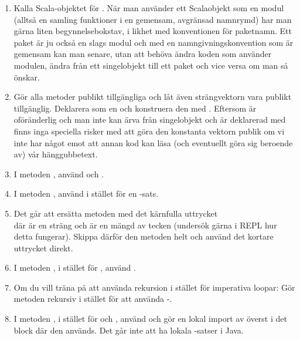 \begin{enumerate}

\item Kalla Scala-objektet för . När man använder ett Scalaobjekt som en modul (alltså en samling funktioner i en gemensam, avgränsad namnrymd) har man gärna liten begynnelsebokstav, i likhet med konventionen för paketnamn. Ett paket är ju också en slags modul och med en namngivningskonvention som är gemensam kan man senare, utan att behöva ändra koden som använder modulen, ändra från ett singelobjekt till ett paket och vice versa om man så önskar.

\item Gör alla metoder publikt tillgängliga och låt även strängvektorn  vara publikt tillgänglig. Deklarera  som en  och konstruera den med . Eftersom  är oföränderlig och man inte kan ärva från singelobjekt och  är deklarerad med  finns inga speciella risker med att göra den konstanta vektorn publik om  vi inte har något emot att annan kod kan läsa (och eventuellt göra sig beroende av) vår hänggubbetext.

\item I metoden , använd  och .

\item I metoden , använd  i stället för en -sats.

\item Det går att ersätta metoden  med det kärnfulla uttrycket \\  där  är en sträng och  är en mängd av tecken (undersök gärna i REPL hur detta fungerar). Skippa därför den metoden helt och använd det kortare uttrycket direkt.

\item I metoden , i stället för , använd .

\item Om du vill träna på att använda rekursion i stället för imperativa loopar: Gör metoden  rekursiv i stället för att använda -.

\item I metoden , i stället för  och , använd  och gör en lokal import av  överst i det block där den används. Det går inte att ha lokala -satser i Java.


\end{enumerate}
